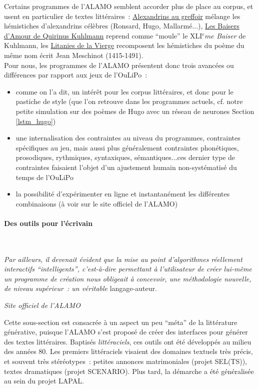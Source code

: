 \documentclass{article}
\newcommand{\subsubsubsection}[1]{\paragraph{#1}\mbox{}\\}
\newenvironment{citationbox}
{\begin{center}
		\begin{minipage}{.8\textwidth}
		}
		{
		\end{minipage}	
\end{center}
}
\begin{document}
					Certains programmes de l'ALAMO semblent accorder plus de place au corpus, et usent en particulier de textes littéraires~: \href{http://www.alamo.free.fr/pmwiki.php?n=Programmes.AlexandrinsAuGreffoir}{Alexandrins au greffoir} mélange les hémistiches d'alexandrins célèbres (Ronsard, Hugo, Mallarmé...), \href{http://www.alamo.free.fr/pmwiki.php?n=Programmes.BaiserDeKuhlman}{Les Baisers d'Amour de Quirinus Kuhlmann} reprend comme ``moule'' le XLI$^eme$ \textit{Baiser} de Kuhlmann, les \href{http://www.alamo.free.fr/pmwiki.php?n=Programmes.LitaniesDeLaVierge}{Litanies de la Vierge} recomposent les hémistiches du poème du même nom écrit Jean Meschinot (1415-1491).\\
					
					Pour nous, les programmes de l'ALAMO présentent donc trois avancées ou différences par rapport aux jeux de l'OuLiPo~:
					\begin{itemize}
						\item comme on l'a dit, un intérêt pour les corpus littéraires, et donc pour le pastiche de style (que l'on retrouve dans les programmes actuels, cf. notre petite simulation sur des poèmes de Hugo avec un réseau de neurones Section \ref{lstm_hugo})
						\item une internalisation des contraintes au niveau du programmes, contraintes spécifiques au jeu, mais aussi plus généralement contraintes phonétiques, prosodiques, rythmiques, syntaxiques, sémantiques...ces dernier type de contraintes faisaient l'objet d'un ajustement humain non-systématisé du temps de l'OuLiPo
						\item la possibilité d'expérimenter en ligne et instantanément les différentes combinaisons (à voir sur le site officiel de l'ALAMO)
					\end{itemize}
				\subsubsubsection{Des outils pour l'écrivain}
					\begin{citationbox}
						\textit{Par ailleurs, il devenait évident que la mise au point d'algorithmes réellement interactifs ``intelligents'', c’est-à-dire permettant à l’utilisateur de créer lui-même un programme de création nous obligeait à concevoir, une méthodologie nouvelle, de niveau supérieur~: un véritable} langage-auteur.
						\begin{flushright}
							\textit{Site officiel de l'ALAMO} \cite{alamo}
						\end{flushright}
					\end{citationbox}
					Cette sous-section est consacrée à un aspect un peu ``méta'' de la littérature générative, puisque l'ALAMO s'est proposé de créer des interfaces pour générer des textes littéraires. Baptisés \textit{littéraciels}, ces outils ont été développés au milieu des années 80. Les premiers littéraciels visaient des domaines textuels très précis, et souvent très stéréotypes~: petites annonces matrimoniales (projet SEL(TS)), textes dramatiques (projet SCENARIO). Plus tard, la démarche a été généralisée au sein du projet LAPAL. 
			
\end{document}

